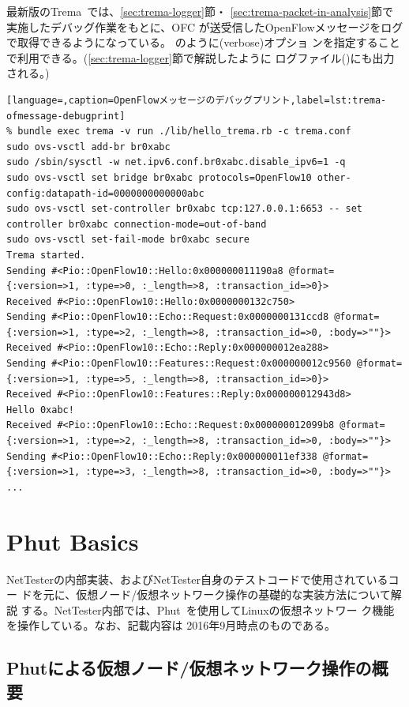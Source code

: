 最新版のTrema~\cite{trema-pr433}では、\ref{sec:trema-logger}節・
\ref{sec:trema-packet-in-analysis}節で実施したデバッグ作業をもとに、OFC
が送受信したOpenFlowメッセージをログで取得できるようになっている。
のように(verbose)オプショ
ンを指定することで利用できる。(\ref{sec:trema-logger}節で解説したように
ログファイル()にも出力される。)
\begin{lstlisting}[language=,caption=OpenFlowメッセージのデバッグプリント,label=lst:trema-ofmessage-debugprint]
% bundle exec trema -v run ./lib/hello_trema.rb -c trema.conf
sudo ovs-vsctl add-br br0xabc
sudo /sbin/sysctl -w net.ipv6.conf.br0xabc.disable_ipv6=1 -q
sudo ovs-vsctl set bridge br0xabc protocols=OpenFlow10 other-config:datapath-id=0000000000000abc
sudo ovs-vsctl set-controller br0xabc tcp:127.0.0.1:6653 -- set controller br0xabc connection-mode=out-of-band
sudo ovs-vsctl set-fail-mode br0xabc secure
Trema started.
Sending #<Pio::OpenFlow10::Hello:0x000000011190a8 @format={:version=>1, :type=>0, :_length=>8, :transaction_id=>0}>
Received #<Pio::OpenFlow10::Hello:0x0000000132c750>
Sending #<Pio::OpenFlow10::Echo::Request:0x0000000131ccd8 @format={:version=>1, :type=>2, :_length=>8, :transaction_id=>0, :body=>""}>
Received #<Pio::OpenFlow10::Echo::Reply:0x000000012ea288>
Sending #<Pio::OpenFlow10::Features::Request:0x000000012c9560 @format={:version=>1, :type=>5, :_length=>8, :transaction_id=>0}>
Received #<Pio::OpenFlow10::Features::Reply:0x000000012943d8>
Hello 0xabc!
Received #<Pio::OpenFlow10::Echo::Request:0x000000012099b8 @format={:version=>1, :type=>2, :_length=>8, :transaction_id=>0, :body=>""}>
Sending #<Pio::OpenFlow10::Echo::Reply:0x000000011ef338 @format={:version=>1, :type=>3, :_length=>8, :transaction_id=>0, :body=>""}>
...
\end{lstlisting}

\section{Phut Basics}
\label{sec:phut_basics}

NetTesterの内部実装、およびNetTester自身のテストコードで使用されているコー
ドを元に、仮想ノード/仮想ネットワーク操作の基礎的な実装方法について解説
する。NetTester内部では、Phut~\cite{phut}を使用してLinuxの仮想ネットワー
ク機能を操作している。なお、記載内容は 2016年9月時点のものである。

\subsection{Phutによる仮想ノード/仮想ネットワーク操作の概要}


